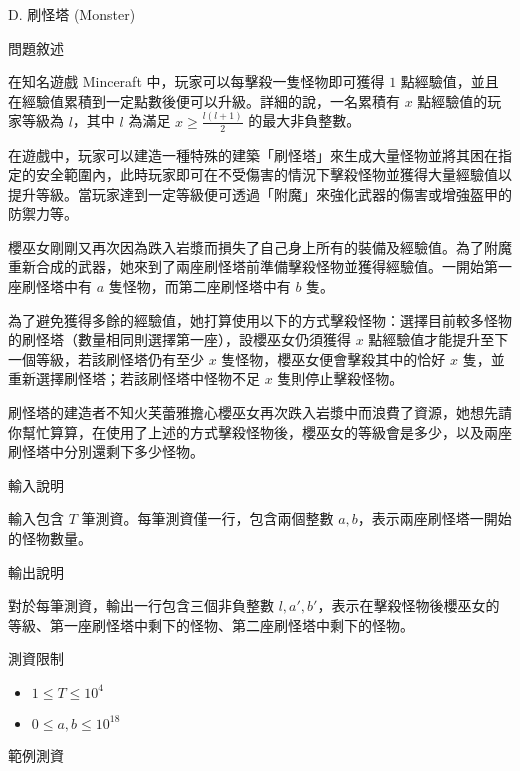 \documentclass[12pt]{article}
\newcommand{\ProblemTitleFont}{\ProblemTitleMainFont\ProblemTitleCJKFont}
\newcommand{\ProblemTitle}[3]{\noindent\Huge{\ProblemTitleFont #1. #2 (#3)}\normalsize\par}
\newcommand{\ProblemSection}[1]{\vspace{0.6cm}\par\noindent\large{\ProblemTitleFont #1}\normalsize\par}
\newcommand{\ProblemStatement}{\ProblemSection{問題敘述}}
\newcommand{\ProblemInput}{\ProblemSection{輸入說明}}
\newcommand{\ProblemOutput}{\ProblemSection{輸出說明}}
\newcommand{\ProblemConstraints}{\ProblemSection{測資限制}}
\newcommand{\ProblemSampleTitle}{\ProblemSection{範例測資}}
\newcounter{ProblemSample}
\begin{document}
\renewcommand{\headrulewidth}{0pt}
\renewcommand{\baselinestretch}{1.3}
\setlength\parindent{24pt}
\setlength\parskip{12pt}
\cfoot{\thepage}

\ProblemTitle{D}{刷怪塔}{Monster}

\ProblemStatement

在知名遊戲 Minceraft 中，玩家可以每擊殺一隻怪物即可獲得 $1$ 點經驗值，並且在經驗值累積到一定點數後便可以升級。詳細的說，一名累積有 $x$ 點經驗值的玩家等級為 $l$，其中 $l$ 為滿足 $x \ge \frac{l(l+1)}{2}$ 的最大非負整數。

在遊戲中，玩家可以建造一種特殊的建築「刷怪塔」來生成大量怪物並將其困在指定的安全範圍內，此時玩家即可在不受傷害的情況下擊殺怪物並獲得大量經驗值以提升等級。當玩家達到一定等級便可透過「附魔」來強化武器的傷害或增強盔甲的防禦力等。

櫻巫女剛剛又再次因為跌入岩漿而損失了自己身上所有的裝備及經驗值。為了附魔重新合成的武器，她來到了兩座刷怪塔前準備擊殺怪物並獲得經驗值。一開始第一座刷怪塔中有 $a$ 隻怪物，而第二座刷怪塔中有 $b$ 隻。

為了避免獲得多餘的經驗值，她打算使用以下的方式擊殺怪物：選擇目前較多怪物的刷怪塔（數量相同則選擇第一座），設櫻巫女仍須獲得 $x$ 點經驗值才能提升至下一個等級，若該刷怪塔仍有至少 $x$ 隻怪物，櫻巫女便會擊殺其中的恰好 $x$ 隻，並重新選擇刷怪塔；若該刷怪塔中怪物不足 $x$ 隻則停止擊殺怪物。

刷怪塔的建造者不知火芙蕾雅擔心櫻巫女再次跌入岩漿中而浪費了資源，她想先請你幫忙算算，在使用了上述的方式擊殺怪物後，櫻巫女的等級會是多少，以及兩座刷怪塔中分別還剩下多少怪物。

\ProblemInput

輸入包含 $T$ 筆測資。每筆測資僅一行，包含兩個整數 $a,b$，表示兩座刷怪塔一開始的怪物數量。

\ProblemOutput

對於每筆測資，輸出一行包含三個非負整數 $l,a',b'$，表示在擊殺怪物後櫻巫女的等級、第一座刷怪塔中剩下的怪物、第二座刷怪塔中剩下的怪物。

\clearpage

\ProblemConstraints

\begin{itemize}
    \item $1 \le T \le 10^4$
    \item $0 \le a,b \le 10^{18}$
\end{itemize}

\ProblemSampleTitle
\end{document}
